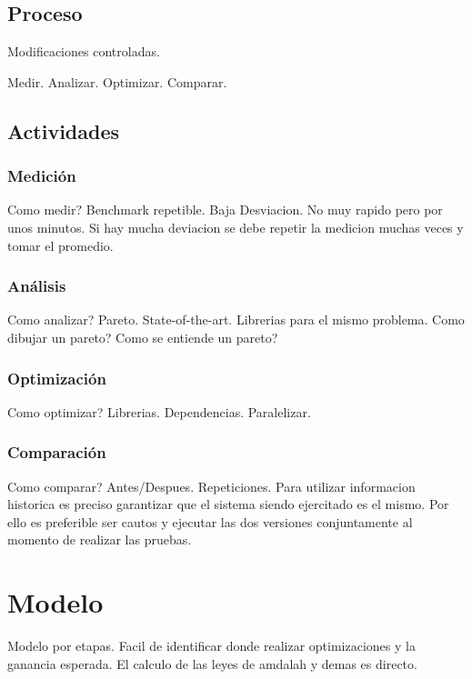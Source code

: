 \documentclass[a4paper]{report}
\begin{document}
\section{Proceso}

Modificaciones controladas.

\bigskip

Medir. Analizar. Optimizar. Comparar.

\section{Actividades}

\subsection{Medici\'on}

Como medir? Benchmark repetible. Baja Desviacion. No muy rapido pero por unos
minutos. Si hay mucha deviacion se debe repetir la medicion muchas veces y
tomar el promedio.

\subsection{An\'alisis}

Como analizar? Pareto. State-of-the-art. Librerias para el mismo problema.
Como dibujar un pareto? Como se entiende un pareto?

\subsection{Optimizaci\'on}

Como optimizar? Librerias. Dependencias. Paralelizar.

\subsection{Comparaci\'on}

Como comparar? Antes/Despues. Repeticiones. Para utilizar informacion
historica es preciso garantizar que el sistema siendo ejercitado es el mismo. Por ello es preferible ser cautos y ejecutar las dos versiones conjuntamente
al momento de realizar las pruebas.

\chapter{Modelo}

Modelo por etapas. Facil de identificar donde realizar optimizaciones y la
ganancia esperada. El calculo de las leyes de amdalah y demas es directo.
\end{document}
